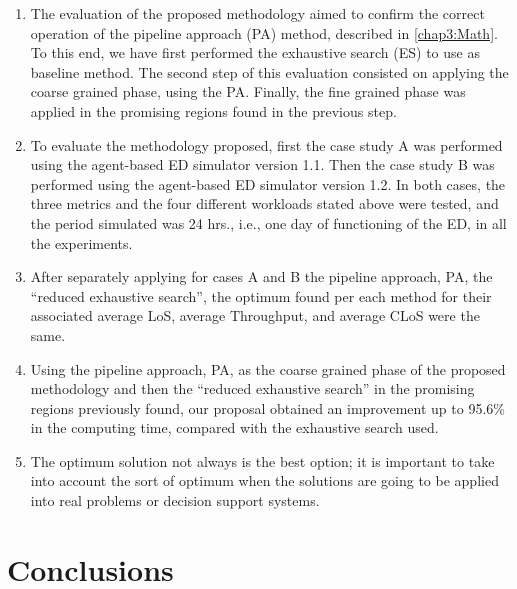 \documentclass[11pt]{article} %
\begin{document}
\begin{enumerate}
\item The evaluation of the proposed methodology aimed to confirm the correct
operation of the pipeline approach (PA) 
method, described in \ref{chap3:Math}. To this end, we have first
performed the exhaustive search (ES) to use as baseline method. The
second step of this evaluation consisted on applying the coarse grained
phase, using the PA.
Finally, the fine grained phase was applied in the promising regions
found in the previous step.\\

\item To evaluate the methodology proposed, first the case study A was performed
using the agent-based ED simulator version 1.1. Then the case study
B was performed using the agent-based ED simulator version 1.2. In
both cases, the three metrics and the four different workloads stated
above were tested, and the period simulated was 24 hrs., i.e., one
day of functioning of the ED, in all the experiments.\\

\item After separately applying for cases A and B  the pipeline approach,
PA,  the \textquotedblleft{}reduced
exhaustive search\textquotedblright{}, the optimum found per each
method for their associated average LoS, average Throughput, and average
CLoS were the same.\\

\item Using the pipeline approach, PA, as the coarse grained phase of the
proposed methodology and then the \textquotedblleft{}reduced exhaustive
search\textquotedblright{} in the promising regions previously found,
our proposal obtained an improvement up to 95.6\% in the computing
time, compared with the
exhaustive search used.
\item The optimum solution not always is the best option; it is important
to take into account the sort of optimum when the solutions are going
to be applied into real problems or decision support systems.
\end{enumerate}




\section{Conclusions}
\label{sec:conclu}
\end{document}
